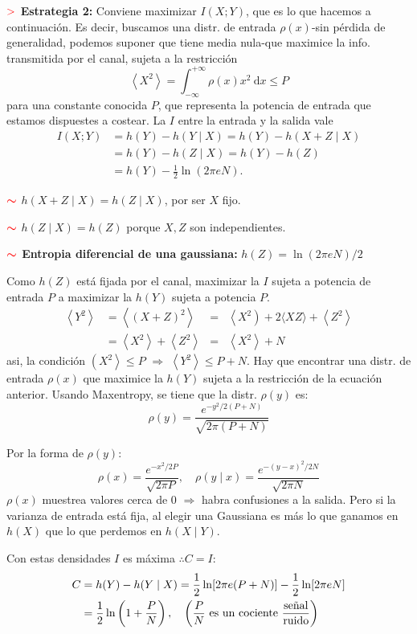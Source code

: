 \documentclass[%
 reprint,
 amsmath,amssymb,
 aps,
]{revtex4-1}
\begin{document}
\textbf{$\textcolor{red}{\mathbf{>}}$ Estrategia 2:}
Conviene maximizar $I(X ; Y)$, que es lo que hacemos a continuación. Es decir, buscamos una distr. de entrada $\rho(x)$-sin pérdida de generalidad, podemos suponer que tiene media nula-que
maximice la info. transmitida por el canal, sujeta a la restricción
$$
\left\langle X^{2}\right\rangle=\int_{-\infty}^{+\infty} \rho(x) x^{2} \mathrm{~d} x \leq P
$$
para una constante conocida $P$, que representa la potencia de entrada que estamos dispuestes a costear.
La $I$ entre la entrada y la salida vale
$$
\begin{aligned}
I(X ; Y) &=h(Y)-h(Y \mid X) =h(Y)-h(X+Z \mid X) \\
&=h(Y)-h(Z \mid X) =h(Y)-h(Z) \\
&=h(Y)-\frac{1}{2} \ln (2 \pi e N) .
\end{aligned}
$$

\textbf{$\textcolor{red}{\color{red}{\boldsymbol{\sim}}}$}
$h(X+Z \mid X)=h(Z \mid X)$, por ser $X$ fijo.

\textbf{$\textcolor{red}{\color{red}{\boldsymbol{\sim}}}$}
$h(Z \mid X)=h(Z)$ porque $X,Z$ son independientes.

\textbf{$\textcolor{red}{\color{red}{\boldsymbol{\sim}}}$ Entropia diferencial de una gaussiana:} 
$h(Z)=\ln (2 \pi e N) / 2$

Como $h(Z)$ está fijada por el canal, maximizar la $I$ sujeta a potencia de entrada $P$ a maximizar la $h(Y)$ sujeta a potencia $P$. $$
\begin{aligned}
\left\langle Y^{2}\right\rangle &=\left\langle(X+Z)^{2}\right\rangle &=&\left\langle X^{2}\right)+2\langle X Z\rangle+\left\langle Z^{2}\right\rangle \\
&=\left\langle X^{2}\right\rangle+\left\langle Z^{2}\right\rangle&=&\left\langle X^{2}\right\rangle+N
\end{aligned}
$$
asi, la condición $\left(X^{2}\right\rangle \leq P$ $\Rightarrow$
$
\left\langle Y^{2}\right\rangle \leq P+N
$. Hay que encontrar una distr. de entrada $\rho(x)$ que maximice la $h(Y)$ sujeta a la restricción de la ecuación anterior. Usando Maxentropy, se tiene que la distr. $\rho(y)$ es:
$$\rho(y)=\frac{e^{-y^{2} / 2(P+N)}}{\sqrt{2 \pi(P+N)}}$$

Por la forma de $\rho(y)$:
$$
  \rho(x) =\frac{e^{-x^{2} / 2 P}}{\sqrt{2 \pi P}} ,\quad \rho(y \mid x) =\frac{e^{-(y-x)^{2} / 2 N}}{\sqrt{2 \pi N}}
$$
$\rho(x)$ muestrea valores cerca de 0 $\Rightarrow$ habra confusiones a la salida. Pero si la varianza de entrada está fija, al elegir una Gaussiana es más lo que ganamos en $h(X)$ que lo que perdemos en $h(X \mid Y)$.

Con estas densidades $I$ es máxima $\therefore C = I$:
$$
\begin{aligned}
C &=h(Y)-h(Y \mid X) =\frac{1}{2} \ln [2 \pi e(P+N)]-\frac{1}{2} \ln [2 \pi e N] \\
&=\frac{1}{2} \ln \left(1+\frac{P}{N}\right), \quad 
\left({P \over N} 
  \text{ es un cociente } {\text{señal} \over \text{ruido}}\right)
\end{aligned}
$$
\end{document}
